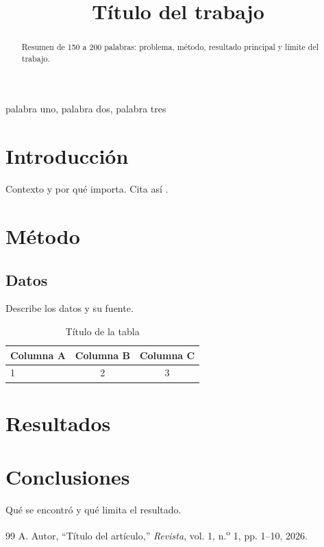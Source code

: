 \documentclass[10pt,twocolumn,letterpaper]{article}
\begin{document}
\title{T\'itulo del trabajo}
\author{
}
\maketitle

\begin{abstract}
Resumen de 150 a 200 palabras: problema, m\'etodo, resultado principal y l\'imite del trabajo.
\end{abstract}
\begin{IEEEkeywords}
palabra uno, palabra dos, palabra tres
\end{IEEEkeywords}

\section{Introducci\'on}
Contexto y por qu\'e importa. Cita as\'i \cite{ejemplo}.

\section{M\'etodo}
\subsection{Datos}
Describe los datos y su fuente.
\begin{table}[!t]
\caption{T\'itulo de la tabla}
\centering\small
\begin{tabular}{@{}lcc@{}}\toprule
Columna A & Columna B & Columna C\\\midrule
1 & 2 & 3\\\bottomrule
\end{tabular}
\end{table}

\section{Resultados}

\section{Conclusiones}
Qu\'e se encontr\'o y qu\'e limita el resultado.

\begin{thebibliography}{99}
 A. Autor, ``T\'itulo del art\'iculo,'' \textit{Revista}, vol. 1, n.\textsuperscript{o} 1, pp. 1--10, 2026.
\end{thebibliography}
\end{document}
